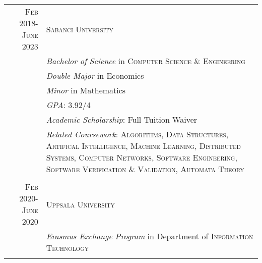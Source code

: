 \documentclass[a4paper,10pt]{article} %
\begin{document}
\begin{longtable}{r|p{11cm}}	


\textsc{Feb} 2018-\textsc{June} 2023& \textsc{Sabanci University}\\
& \small\emph{Bachelor of Science} in \textsc{Computer Science \& Engineering}\\%
& \small\emph{Double Major} in Economics\\
& \small\emph{Minor} in Mathematics\\
& \small\emph{GPA}: 3.92/4 \\
& \small\emph{Academic Scholarship}: Full Tuition Waiver\\
& \footnotesize{ \small\emph{Related Coursework}: \textsc{Algorithms}, \textsc{Data Structures}, \textsc{Artifical Intelligence}, \textsc{Machine Learning}, \textsc{Distributed Systems}, \textsc{Computer Networks}, \textsc{Software Engineering}, \textsc{Software Verification \& Validation}, \textsc{Automata Theory}}\\
\multicolumn{2}{c}{} \\

\textsc{Feb} 2020-\textsc{June} 2020& \textsc{Uppsala University}\\
& \small\emph{Erasmus Exchange Program} in Department of \textsc{Information Technology}\\%
&\\

\end{longtable}
\end{document}
